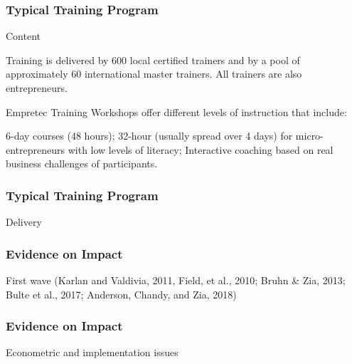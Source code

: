 \documentclass[hideothersubsections, usenames,dvipsnames,11pt]{beamer}
\newenvironment{itemize_3pt}{\itemize\addtolength{\itemsep}{3pt}}{\enditemize}
\begin{document}

\begin{frame}
\frametitle{Typical Training Program}
	Content
	\begin{itemize_3pt}
	\item Training is delivered by 600 local certified trainers and by a pool of approximately 60 international master trainers. All trainers are also entrepreneurs.
	\item Empretec Training Workshops offer different levels of instruction that include:
	\item 6-day courses (48 hours); 32-hour (usually spread over 4 days) for micro-entrepreneurs with low levels of literacy; Interactive coaching based on real business challenges of participants.
	\vspace{0.1in}
	\end{itemize_3pt}
\end{frame}

\begin{frame}
\frametitle{Typical Training Program}
	Delivery 
	\begin{itemize_3pt}
	\item %
	\vspace{0.1in}
	\end{itemize_3pt}
\end{frame}


\begin{frame}
\frametitle{Evidence on Impact}
	\begin{itemize_3pt}
	\item First wave (Karlan and Valdivia, 2011, Field, et al., 2010; Bruhn \& Zia, 2013; Bulte et al., 2017; Anderson, Chandy, and Zia, 2018)
					 \citep{Karlan2011} \citep{Field2010} \citep{Bruhn2013} \citep{Bulte2017} \citep{Anderson2018}
	\vspace{0.1in}
	\end{itemize_3pt}
\end{frame}

\begin{frame}
\frametitle{Evidence on Impact}
	\begin{itemize_3pt}
	\item Econometric and implementation issues \citep{McKenzie2014}
	\vspace{0.1in}
	\end{itemize_3pt}
\end{frame}
\end{document}
